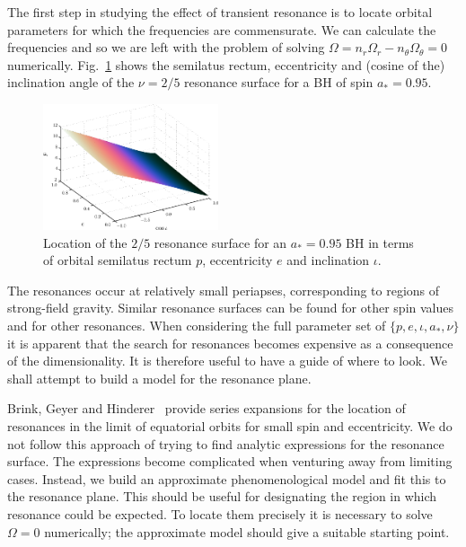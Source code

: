 \documentclass[aps,prd,amsfonts,amssymb,amsmath,nofootinbib,reprint,showpacs,superscriptaddress,twocolumn]{revtex4}
\newcommand{\Figref}[1]{Fig.\ \ref{fig:#1}}
\begin{document}
The first step in studying the effect of transient resonance is to locate orbital parameters for which the frequencies are commensurate. We can calculate the frequencies and so we are left with the problem of solving $\Omega = n_r \Omega_r - n_\theta \Omega_\theta = 0$ numerically. \Figref{res-plane-2-5-95} shows the semilatus rectum, eccentricity and (cosine of the) inclination angle of the $\nu = 2/5$ resonance surface for a BH of spin $a_\ast = 0.95$. 
\begin{figure}[htbp]
\centering
\includegraphics[width=0.46\textwidth]{Fig_res-2-5-95-plane}
\caption{\label{fig:res-plane-2-5-95}Location of the $2/5$ resonance surface for an $a_\ast = 0.95$ BH in terms of orbital semilatus rectum $p$, eccentricity $e$ and inclination $\iota$.}
\end{figure}
The resonances occur at relatively small periapses, corresponding to regions of strong-field gravity.
Similar resonance surfaces can be found for other spin values and for other resonances. When considering the full parameter set of $\{p,e,\iota,a_\ast,\nu\}$ it is apparent that the search for resonances becomes expensive as a consequence of the dimensionality. It is therefore useful to have a guide of where to look. We shall attempt to build a model for the resonance plane.

Brink, Geyer and Hinderer~\cite{Brink2013} provide series expansions for the location of resonances in the limit of equatorial orbits for small spin and eccentricity. We do not follow this approach of trying to find analytic expressions for the resonance surface. The expressions become complicated when venturing away from limiting cases. Instead, we build an approximate phenomenological model and fit this to the resonance plane.%
This should be useful for designating the region in which resonance could be expected. To locate them precisely it is necessary to solve $\Omega = 0$ numerically; the approximate model should give a suitable starting point.
\end{document}
